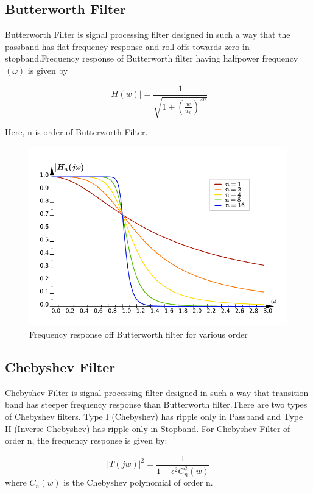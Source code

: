 \documentclass[a4paper,11pt]{article}
\begin{document}
\subsection{Butterworth Filter}
Butterworth Filter is signal processing filter designed in such a way that the passband has flat frequency response and roll-offs towards zero in  stopband.Frequency response of Butterworth filter  having halfpower frequency $(\omega)$ is given by

\begin{equation*}
    |H(w)| = \frac{1}{\sqrt{1+(\frac{w}{w_0})^{2n}}}
\end{equation*}

Here, n is order of Butterworth Filter.

\begin{figure}[H]
    \centering
    \includegraphics[width=0.9\linewidth]{./FIG/butterworth .pdf}
    \caption{Frequency response off Butterworth filter for various order}
\end{figure}


\subsection{Chebyshev Filter}
Chebyshev Filter is signal processing filter designed in such a way that transition band has steeper frequency response than Butterworth filter.There are two types of Chebyshev filters. Type I (Chebyshev) has ripple only in Passband and Type II (Inverse Chebyshev) has ripple only in Stopband. For Chebyshev Filter  of order n, the frequency response is given by:

\begin{equation*}
    {|T(jw)|}^2 = \frac{1}{1+{\epsilon}^{2}{C}_n^2(w)}
\end{equation*}
{where} $C_n(w)$ is the Chebyshev polynomial of order n.
\end{document}
